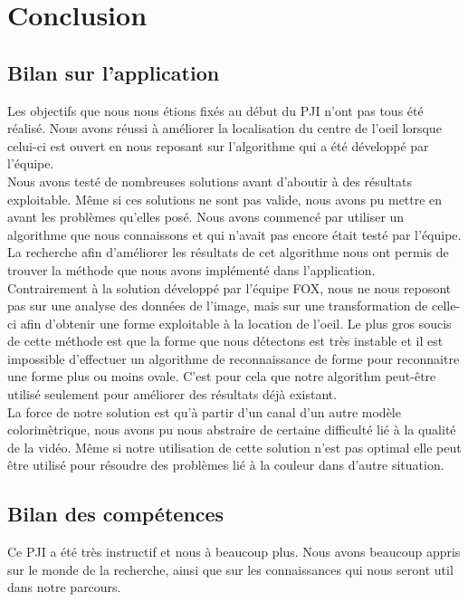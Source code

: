 \section{Conclusion}

\subsection{Bilan sur l'application}
Les objectifs que nous nous étions fixés au début du PJI n'ont pas tous été réalisé. Nous avons réussi à
améliorer la localisation du centre de l'oeil lorsque celui-ci est ouvert en nous reposant sur 
l'algorithme qui a été développé par l'équipe.\\

Nous avons testé de nombreuses solutions avant d'aboutir à des résultats exploitable. Même si 
ces solutions ne sont pas valide, nous avons pu mettre en avant les problèmes qu'elles posé.
Nous avons commencé par utiliser un algorithme que nous connaissons et qui n'avait pas encore 
était testé par l'équipe. La recherche afin d'améliorer les résultats de cet algorithme nous 
ont permis de trouver la méthode que nous avons implémenté dans l'application.\\

Contrairement à la solution développé par l'équipe FOX, nous ne nous reposont pas sur une analyse des 
données de l'image, mais sur une transformation de celle-ci afin d'obtenir une forme exploitable
à la location de l'oeil. Le plus gros soucis de cette méthode est que la forme que nous détectons
est très instable et il est impossible d'effectuer un algorithme de reconnaissance de forme pour 
reconnaitre une forme plus ou moins ovale. C'est pour cela que notre algorithm peut-être utilisé
seulement pour améliorer des résultats déjà existant.\\

La force de notre solution est qu'à partir d'un canal d'un autre modèle colorimètrique, nous avons pu 
nous abstraire de certaine difficulté lié à la qualité de la vidéo. Même si notre utilisation de cette
solution n'est pas optimal elle peut être utilisé pour résoudre des problèmes lié à la couleur dans d'autre situation.\\

\subsection{Bilan des compétences}
Ce PJI a été très instructif et nous à beaucoup plus. Nous avons beaucoup appris sur le monde 
de la recherche, ainsi que sur les connaissances qui nous seront util dans notre parcours.\\


